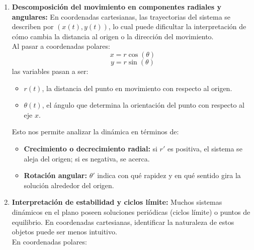 \documentclass[12pt, a4paper]{report}
\begin{document}
\begin{enumerate}
	\item \textbf{Descomposición del movimiento en componentes radiales y angulares:}
	En coordenadas cartesianas, las trayectorias del sistema se describen por $(x(t),y(t))$, lo cual puede dificultar la interpretación de cómo cambia la distancia al origen o la dirección del movimiento.\\

	Al pasar a coordenadas polares:
	\begin{equation}\label{eq:xpolar}
		x=r\cos(\theta)
	\end{equation}
	\begin{equation}\label{eq:ypolar}
		y=r\sin(\theta)
	\end{equation}
	las variables pasan a ser:
	\begin{itemize}
		\item $r(t)$, la distancia del punto en movimiento con respecto al origen.
		\item $\theta(t)$, el ángulo que determina la orientación del punto con respecto al eje $x$.
	\end{itemize}
	
	Esto nos permite analizar la dinámica en términos de:
	\begin{itemize}
		\item \textbf{Crecimiento o decrecimiento radial:} si $r'$ es positiva, el sistema se aleja del origen; si es negativa, se acerca.
		\item \textbf{Rotación angular:} $\theta'$  indica con qué rapidez y en qué sentido gira la solución alrededor del origen.
	\end{itemize}
	\item \textbf{Interpretación de estabilidad y ciclos límite:}
	Muchos sistemas dinámicos en el plano poseen soluciones periódicas (ciclos límite) o puntos de equilibrio. En coordenadas cartesianas, identificar la naturaleza de estos objetos puede ser menos intuitivo.\\

	En coordenadas polares:


\end{enumerate}
\end{document}
